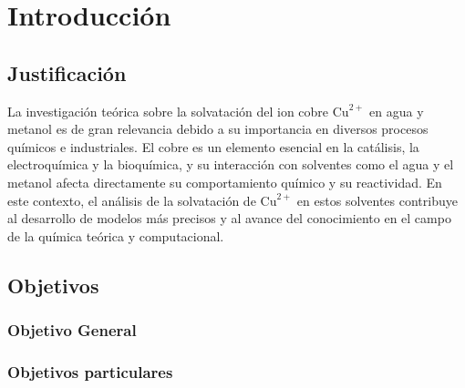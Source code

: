 \chapter{Introducción}
    \section{Justificación} 
        La investigación teórica sobre la solvatación del ion cobre \( \text{Cu}^{2+} \) en agua y metanol es de gran relevancia debido a su importancia en diversos procesos químicos e industriales. El cobre es un elemento esencial en la catálisis, la electroquímica y la bioquímica, y su interacción con solventes como el agua y el metanol afecta directamente su comportamiento químico y su reactividad. %
        En este contexto, el análisis de la solvatación de \( \text{Cu}^{2+} \) en estos solventes contribuye al desarrollo de modelos más precisos y al avance del conocimiento en el campo de la química teórica y computacional. \cite{lozano2014que} %
    
    \section{Objetivos}
        \subsection{Objetivo General}
        \subsection{Objetivos particulares}